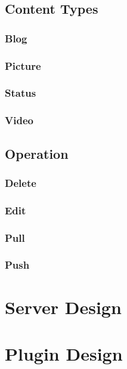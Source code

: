 \documentclass{report}
\begin{document}
		\subsection{Content Types}

			\subsubsection{Blog}

			\subsubsection{Picture}

			\subsubsection{Status}

			\subsubsection{Video}
		\subsection{Operation}

			\subsubsection{Delete}
				
			\subsubsection{Edit}
			
			\subsubsection{Pull}	
			
			\subsubsection{Push}	

	\section{Server Design}

	\section{Plugin Design}
\end{document}
